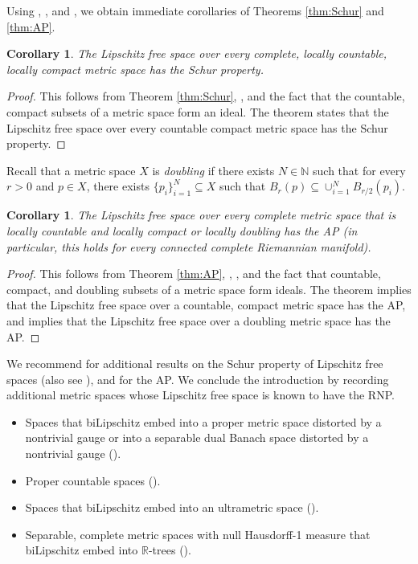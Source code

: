 \documentclass[12pt]{amsart}
\newtheorem{corollary}[theorem]{Corollary}
\theoremstyle{definition}
\numberwithin{equation}{section}
\def \R {\mathbb{R}}
\def \N {\mathbb{N}}
\def \sbs {\subseteq}
\begin{document}
Using \cite{LancienSchur}, \cite{Daletcompact}, and \cite{Lanciendoubling}, we obtain immediate corollaries of Theorems \ref{thm:Schur} and \ref{thm:AP}.

\begin{corollary}
The Lipschitz free space over every complete, locally countable, locally compact metric space has the Schur property.
\end{corollary}

\begin{proof}
This follows from Theorem \ref{thm:Schur}, \cite[Theorem 3.1]{LancienSchur}, and the fact that the countable, compact subsets of a metric space form an ideal. The theorem \cite[Theorem 3.1]{LancienSchur} states that the Lipschitz free space over every countable compact metric space has the Schur property.
\end{proof}

Recall that a metric space $X$ is \emph{doubling} if there exists $N \in \N$ such that for every $r > 0$ and $p \in X$, there exists $\{p_i\}_{i=1}^N \sbs X$ such that $B_r(p) \sbs \cup_{i=1}^N B_{r/2}(p_i)$.

\begin{corollary}
The Lipschitz free space over every complete metric space that is locally countable and locally compact or locally doubling has the AP (in particular, this holds for every connected complete Riemannian manifold).
\end{corollary}

\begin{proof}
This follows from Theorem \ref{thm:AP}, \cite[Theorem 3.1]{Daletcompact}, \cite[Corollary 2.2]{Lanciendoubling}, and the fact that countable, compact, and doubling subsets of a metric space form ideals. The theorem \cite[Theorem 3.1]{Daletcompact} implies that the Lipschitz free space over a countable, compact metric space has the AP, and \cite[Corollary 2.2]{Lanciendoubling} implies that the Lipschitz free space over a doubling metric space has the AP.
\end{proof}

We recommend \cite{Petitjean} for additional results on the Schur property of Lipschitz free spaces (also see \cite[Section 4]{APP2}), and \cite{LancienSchur} for the AP. We conclude the introduction by recording additional metric spaces whose Lipschitz free space is known to have the RNP.
\begin{itemize}
\item Spaces that biLipschitz embed into a proper metric space distorted by a nontrivial gauge or into a separable dual Banach space distorted by a nontrivial gauge (\cite[Proposition 6.3]{K}).
\item Proper countable spaces (\cite[Theorem 2.1]{Daletproper}).
\item Spaces that biLipschitz embed into an ultrametric space (\cite[Theorem 2]{Cuth}).
\item Separable, complete metric spaces with null Hausdorff-1 measure that biLipschitz embed into $\R$-trees (\cite[Theorem 1.2]{APP1}).
\end{itemize}
\end{document}
